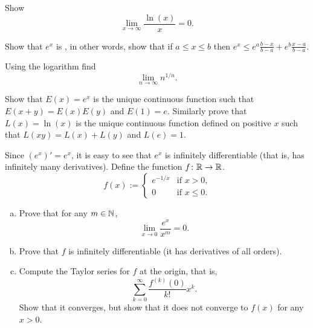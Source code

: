 \begin{exercise}
Show
\begin{equation*}
\lim_{x\to\infty} \frac{\ln(x)}{x} = 0 .
\end{equation*}
\end{exercise}

\begin{exercise}
Show that $e^x$ is \emph{}, in other words, show that 
if $a \leq x \leq b$ then
$e^x \leq e^a \frac{b-x}{b-a} + e^b \frac{x-a}{b-a}$.
\end{exercise}

\begin{exercise}
Using the logarithm find
\begin{equation*}
\lim_{n\to\infty} n^{1/n} .
\end{equation*}
\end{exercise}

\begin{exercise}
Show that $E(x) = e^x$ is the unique continuous function such that
$E(x+y) = E(x)E(y)$ and $E(1) = e$.   Similarly prove that $L(x) = \ln(x)$
is the unique continuous
function defined on positive $x$ such that $L(xy) = L(x)+L(y)$
and $L(e) = 1$.
\end{exercise}

\begin{exercise}\label{exercise:nonanalytic}
Since $(e^x)' = e^x$, it is easy to see that $e^x$ is infinitely
differentiable (that is, has infinitely many derivatives).  Define the function $f \colon {\mathbb{R}} \to {\mathbb{R}}$.
\begin{equation*}
f(x) := \begin{cases}
e^{-1/x} & \text{if $x > 0$,} \\
0 & \text{if $x \leq 0$}.
\end{cases}
\end{equation*}
\begin{enumerate}[a)]
\item
Prove that for any $m \in {\mathbb{N}}$,
\begin{equation*}
\lim_{x \to 0} \frac{e^x}{x^m} = 0 .
\end{equation*}
\item
Prove that $f$ is infinitely differentiable (it has derivatives of all
orders).
\item
Compute the Taylor series for $f$ at the origin, that is,
\begin{equation*}
\sum_{k=0}^\infty
\frac{f^{(k)}(0)}{k!}x^k .
\end{equation*}
Show that it converges, but show that it does not converge to $f(x)$
for any $x > 0$.
\end{enumerate}
\end{exercise}

